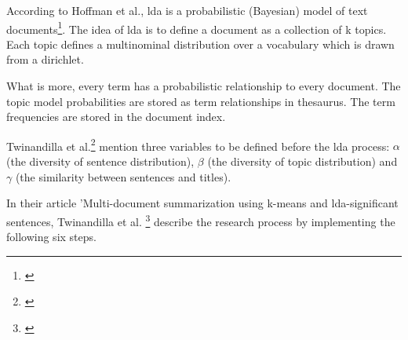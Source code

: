 According to Hoffman et al., \gls{lda} is a probabilistic (Bayesian) model of text documents\footnote{\autocite{hoffman_2010}}. The idea of \gls{lda} is to define a document as a collection of k topics. Each topic defines a multinominal distribution over a vocabulary which is drawn from a dirichlet.

What is more, every term has a probabilistic relationship to every document. The topic model probabilities are stored as term relationships in thesaurus. The term frequencies are stored in the document index.

Twinandilla et al.\footnote{\autocite{twinandilla_2018}} mention three variables to be defined before the \gls{lda} process: $\alpha$ (the diversity of sentence distribution), $\beta$ (the diversity of topic distribution) and $\gamma$ (the similarity between sentences and titles).

In their article 'Multi-document summarization using k-means and \gls{lda}-significant sentences, Twinandilla et al. \footnote{\autocite{twinandilla_2018}} describe the research process by implementing the following six steps.

